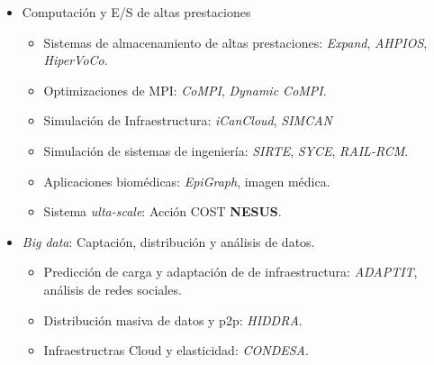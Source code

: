 \begin{frame}
  \begin{itemize}
    \item Computación y E/S de altas prestaciones
      \begin{itemize}
        \item Sistemas de almacenamiento de altas prestaciones: \emph{Expand}, \emph{AHPIOS}, \emph{HiperVoCo}.
        \item Optimizaciones de MPI: \emph{CoMPI}, \emph{Dynamic CoMPI}.
        \item Simulación de Infraestructura: \emph{iCanCloud}, \emph{SIMCAN}
        \item Simulación de sistemas de ingeniería: \emph{SIRTE}, \emph{SYCE}, \emph{RAIL-RCM}.
        \item Aplicaciones biomédicas: \emph{EpiGraph}, imagen médica.
        \item Sistema \emph{ulta-scale}: Acción COST \textbf{NESUS}.
      \end{itemize}
    \vspace{1em}
    \item \pause \emph{Big data}: Captación, distribución y análisis de datos.
      \begin{itemize}
        \item Predicción de carga y adaptación de de infraestructura: \emph{ADAPTIT}, análisis de redes sociales.
        \item Distribución masiva de datos y p2p: \emph{HIDDRA}.
        \item Infraestructras Cloud y elasticidad: \emph{CONDESA}.
      \end{itemize}
  \end{itemize}
\end{frame}

